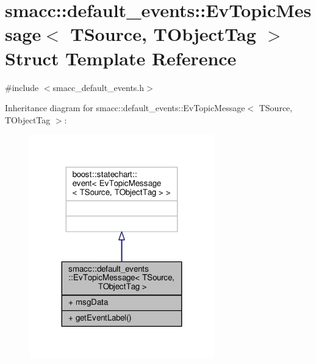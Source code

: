 \hypertarget{structsmacc_1_1default__events_1_1EvTopicMessage}{}\section{smacc\+:\+:default\+\_\+events\+:\+:Ev\+Topic\+Message$<$ T\+Source, T\+Object\+Tag $>$ Struct Template Reference}
\label{structsmacc_1_1default__events_1_1EvTopicMessage}


{\ttfamily \#include $<$smacc\+\_\+default\+\_\+events.\+h$>$}



Inheritance diagram for smacc\+:\+:default\+\_\+events\+:\+:Ev\+Topic\+Message$<$ T\+Source, T\+Object\+Tag $>$\+:\nopagebreak
\begin{figure}[H]
\begin{center}
\leavevmode
\includegraphics[width=227pt]{structsmacc_1_1default__events_1_1EvTopicMessage__inherit__graph}
\end{center}
\end{figure}


